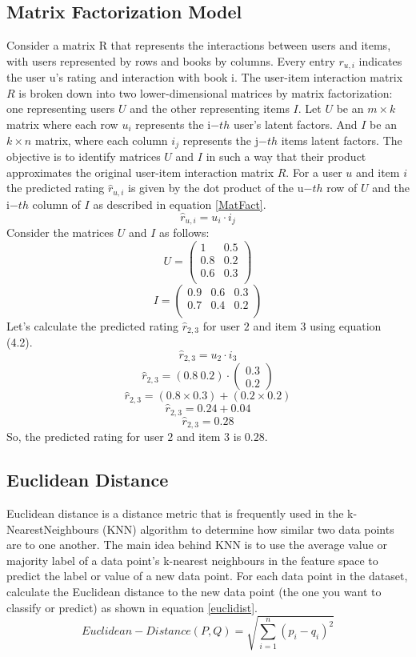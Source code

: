 \subsection{Matrix Factorization Model}
Consider a matrix R that represents the interactions between users and items, with users represented by rows and books by columns. Every entry \(r_{u,i}\) indicates the user u's rating and interaction with book i.
The user-item interaction matrix \(R\) is broken down into two lower-dimensional matrices by matrix factorization: one representing users \(U\) and the other representing items \(I\). Let \(U\) be an \(m \times k\) matrix where each row \(u_{i}\) represents the i\(-th\) user's latent factors. And \(I\) be an \(k \times n\) matrix, where each column \(i_{j}\) represents the j\(-th\) items latent factors. The objective is to identify matrices \(U\) and \(I\) in such a way that their product approximates the original user-item interaction matrix \(R\).
For a user \(u\) and item \(i\) the predicted rating \(\hat{r}_{u,i}\) is given by the dot product of the u\(-th\) row of \(U\) and the i\(-th\) column of \(I\) 
as described in equation \ref{MatFact}.
\begin{equation}
\label{MatFact}
\hat{r}_{u,i} = u_i \cdot i_j
\end{equation}
Consider the matrices $U$ and $I$ as follows:
\[ U = \begin{pmatrix}
1 & 0.5 \\
0.8 & 0.2 \\
0.6 & 0.3 \\
\end{pmatrix} \]
\[ I = \begin{pmatrix}
0.9 & 0.6 & 0.3 \\
0.7 & 0.4 & 0.2 \\
\end{pmatrix} \]
Let's calculate the predicted rating $\hat{r}_{2,3}$ for user $2$ and item $3$ using equation (4.2).
\[ \hat{r}_{2,3} = u_2 \cdot i_3 \]
\[ \hat{r}_{2,3} = (0.8 \ 0.2) \cdot \begin{pmatrix} 0.3 \\ 0.2 \end{pmatrix} \]
\[ \hat{r}_{2,3} = (0.8 \times 0.3) + (0.2 \times 0.2) \]
\[ \hat{r}_{2,3} = 0.24 + 0.04 \]
\[ \hat{r}_{2,3} = 0.28 \]
So, the predicted rating for user $2$ and item $3$ is $0.28$.

\subsection{Euclidean Distance}
Euclidean distance is a distance metric that is frequently used in the k-NearestNeighbours (KNN) algorithm to determine how similar two data points are to one another. The main idea behind KNN is to use the average value or majority label of a data point's k-nearest neighbours in the feature space to predict the label or value of a new data point.
For each data point in the dataset, calculate the Euclidean distance to the new data point (the one you want to classify or predict) as shown in equation \ref{euclidist}.
\begin{equation}
\label{euclidist}
Euclidean-Distance(P, Q) = \sqrt{{\sum_{i=1}^{n} (p_i - q_i)^2}}
\end{equation}

